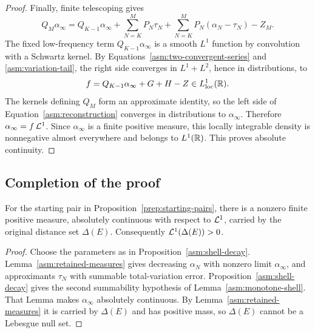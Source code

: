 \begin{proof}
Finally, finite telescoping gives
\begin{equation}
 \label{asm:reconstruction}
 Q_M\alpha_\infty
 =Q_{K-1}\alpha_\infty
  +\sum_{N=K}^MP_N\tau_N
  +\sum_{N=K}^MP_N(\alpha_N-\tau_N)-Z_M.
\end{equation}
The fixed low-frequency term $Q_{K-1}\alpha_\infty$ is a smooth
$L^1$ function by convolution with a Schwartz kernel.  By
Equations~\eqref{asm:two-convergent-series} and
\eqref{asm:variation-tail}, the right side converges in
$L^1+L^2$, hence in distributions, to
\[
 f=Q_{K-1}\alpha_\infty+G+H-Z\in L^1_{\mathrm{loc}}(\mathbb R).
\]
The kernels defining $Q_M$ form an approximate identity, so the
left side of Equation~\eqref{asm:reconstruction} converges in
distributions to $\alpha_\infty$.  Therefore
$\alpha_\infty=f\,\mathcal L^1$.  Since $\alpha_\infty$ is a finite
positive measure, this locally integrable density is nonnegative
almost everywhere and belongs to $L^1(\mathbb R)$.  This proves absolute
continuity.
\end{proof}

\subsection{Completion of the proof}

\begin{proposition}\label{asm:completion}
For the starting pair in Proposition~\ref{prep:starting-pairs}, there
is a nonzero finite positive measure, absolutely continuous with
respect to $\mathcal L^1$, carried by the original distance set $\Delta(E)$.
Consequently $\mathcal L^1(\Delta(E))>0$.
\end{proposition}

\begin{proof}
Choose the parameters as in Proposition~\ref{asm:shell-decay}.
Lemma~\ref{asm:retained-measures} gives decreasing $\alpha_N$ with
nonzero limit $\alpha_\infty$, and approximants $\tau_N$ with
summable total-variation error.  Proposition~\ref{asm:shell-decay}
gives the second summability hypothesis of
Lemma~\ref{asm:monotone-shell}.  That Lemma makes $\alpha_\infty$
absolutely continuous.  By Lemma~\ref{asm:retained-measures} it is
carried by $\Delta(E)$ and has positive mass, so $\Delta(E)$ cannot
be a Lebesgue null set.
\end{proof}

